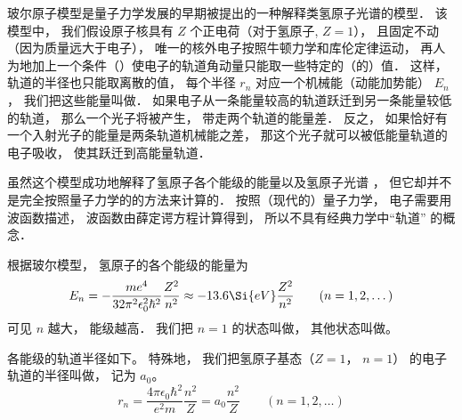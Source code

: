 

玻尔原子模型是量子力学发展的早期被提出的一种解释类氢原子光谱的模型． 该模型中， 我们假设原子核具有 $Z$ 个正电荷（对于氢原子, $Z = 1$）， 且固定不动（因为质量远大于电子）， 唯一的核外电子按照牛顿力学和库伦定律运动， 再人为地加上一个条件（）使电子的轨道角动量只能取一些特定的（的）值． 这样， 轨道的半径也只能取离散的值， 每个半径 $r_n$ 对应一个机械能（动能加势能） $E_n$， 我们把这些能量叫做． 如果电子从一条能量较高的轨道跃迁到另一条能量较低的轨道， 那么一个光子将被产生， 带走两个轨道的能量差． 反之， 如果恰好有一个入射光子的能量是两条轨道机械能之差， 那这个光子就可以被低能量轨道的电子吸收， 使其跃迁到高能量轨道．

虽然这个模型成功地解释了氢原子各个能级的能量以及氢原子光谱%
， 但它却并不是完全按照量子力学的的方法来计算的． 按照（现代的）量子力学， 电子需要用波函数描述， 波函数由薛定谔方程计算得到， 所以不具有经典力学中“轨道” 的概念．

根据玻尔模型， 氢原子的各个能级的能量为
\begin{equation}
E_n =  - \frac{m e^4}{32 \pi^2 \epsilon_0^2 \hbar ^2} \frac{Z^2}{n^2} \approx - 13.6\Si{eV} \frac{Z^2}{n^2}
\qquad (n = 1, 2, \dots)
\end{equation}
可见 $n$ 越大， 能级越高． 我们把 $n = 1$ 的状态叫做， 其他状态叫做。 

各能级的轨道半径如下。 特殊地， 我们把氢原子基态（$Z = 1$， $n = 1$） 的电子轨道的半径叫做， 记为 $a_0$。
\begin{equation}\label{BohrMd_eq1}
r_n = \frac{4\pi \epsilon_0 \hbar^2}{e^2 m}\frac{n^2}{Z} = a_0 \frac{n^2}{Z}
\qquad (n = 1, 2, \dots)
\end{equation}


